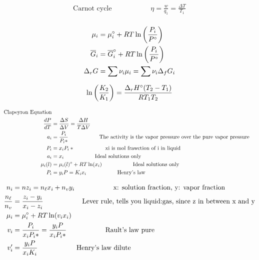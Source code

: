 \documentclass[10pt]{article} %
\begin{document}
\begin{align*}
  \mbox{Carnot cycle}&\hspace{2cm}\eta = \frac{w}{q_1} = \frac{\Delta T}{T_1}\\
\end{align*}

\begin{align*}
  \mu_i &= \mu_i\degree + RT\ln\left(\frac{P_i}{P\degree}\right)\\
  \overline{G}_i &= \overline{G}_i\degree + RT\ln\left(\frac{P_i}{P\degree}\right)\\
  \Delta_r G &= \sum \nu_i\mu_i = \sum \nu_i \Delta_f G_i\\
\end{align*}

\begin{align*}
  \ln\left(\frac{K_2}{K_1}\right) &= \frac{\Delta_r H\degree(T_2-T_1)}{RT_1T_2}\\
\end{align*}

\begin{align*}
  \mbox{Clapeyron Equation}\\
  \frac{dP}{dT} &= \frac{\Delta S}{\Delta V} = \frac{\Delta H}{T\Delta V}\\
  a_i &= \frac{P_i}{P_i*}\hspace{2cm}\mbox{The activity is the vapor pressure over the pure vapor pressure}\\
  P_i &= x_iP_i*\hspace{2cm}\mbox{xi is mol frawction of i in liquid}\\
  a_i &= x_i\hspace{2cm}\mbox{Ideal solutions only}\\
  \mu_i(l) &= \mu_i(l)\degree + RT\ln(x_i)\hspace{2cm}\mbox{Ideal solutions only}\\
  P_i &= y_iP = K_ix_i\hspace{2cm}\mbox{Henry's law}\\
\end{align*}

\begin{align*}
  n_i &= nz_i = n_{\ell}x_i + n_{v}y_i\hspace{2cm}\mbox{x: solution fraction, y: vapor fraction}\\
  \frac{n_\ell}{n_v} &= \frac{z_i - y_i}{x_i - z_i}\hspace{2cm}\mbox{Lever rule, tells you liquid:gas, since z in between x and y}\\
  \mu_i &= \mu_i\degree + RT\ln(v_ix_i)\\
  v_i &= \frac{P_i}{x_iP_i*} = \frac{y_iP}{x_iP_i*}\hspace{2cm}\mbox{Rault's law pure}\\
  v_i' &= \frac{y_iP}{x_iK_i}\hspace{2cm}\mbox{Henry's law dilute}\\
\end{align*}
\end{document}

